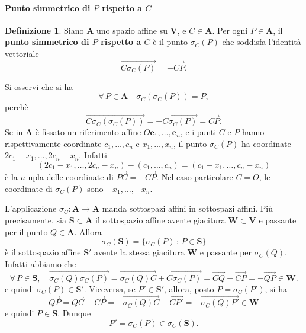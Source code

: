 \documentclass{article}
\theoremstyle{plain}
\theoremstyle{definition}
\newtheorem{defn}{Definizione}[section]
\theoremstyle{remark}
\begin{document}
\paragraph{Punto simmetrico di $P$ rispetto a $C$}
\begin{bxthm}
\begin{defn}
    Siano $\mathbf{A}$ uno spazio affine su $\mathbf{V}$, e $C\in\mathbf{A}$. 
    Per ogni $P\in \mathbf{A}$, il \textbf{punto simmetrico di $P$ rispetto a $C$} 
    è il punto $\sigma_C(P)$ che soddisfa l'identità vettoriale \[\overrightarrow{C\sigma_C(P)}=-\overrightarrow{CP}.\]
\end{defn}
\end{bxthm}

\vspace{10pt}

Si osservi che si ha \[\forall\,P\in\mathbf{A}\quad\sigma_C(\sigma_C(P)) = P,\]
perchè \[\overrightarrow{C\sigma_C(\sigma_C(P))}=-\overrightarrow{C\sigma_C(P)}=\overrightarrow{CP}.\]
Se in $\mathbf{A}$ è fissato un riferimento affine $O\mathbf{e}_1,\dots,\mathbf{e}_n$, e i punti $C$ e $P$ hanno rispettivamente coordinate $c_1,\dots,c_n$ e $x_1,\dots,x_n$, 
il punto $\sigma_C(P)$ ha coordinate $2c_1-x_1,\dots,2c_n-x_n$. Infatti 
\[(2c_1-x_1,\dots,2c_n-x_n)-(c_1,\dots,c_n)=(c_1-x_1,\dots,c_n-x_n)\] è la $n$-upla delle coordinate di $\overrightarrow{PC}=-\overrightarrow{CP}$. 
Nel caso particolare $C=O$, le coordinate di $\sigma_C(P)$ sono $-x_1,\dots,-x_n$.

\vspace{10pt}

L'applicazione $\sigma_C:\mathbf{A}\to\mathbf{A}$ manda sottospazi affini in sottospazi affini. 
Più precisamente, sia $\mathbf{S}\subset \mathbf{A}$ il sottospazio affine avente giacitura $\mathbf{W}\subset\mathbf{V}$ e passante per il punto $Q\in\mathbf{A}$. 
Allora \[\sigma_C(\mathbf{S})=\{\sigma_C(P)\,:\,P\in \mathbf{S}\}\] è il sottospazio affine $\mathbf{S}'$ avente la stessa giacitura $\mathbf{W}$ e passante per $\sigma_C(Q)$.
Infatti abbiamo che 
\[\forall\,P\in \mathbf{S},\quad \overrightarrow{\sigma_C(Q)\sigma_C(P)}=\overrightarrow{\sigma_C(Q)C}+\overrightarrow{C\sigma_C(P)}=\overrightarrow{CQ}-\overrightarrow{CP}=-\overrightarrow{QP}\in\mathbf{W}.\]
e quindi $\sigma_C(P)\in \mathbf{S}'$. Viceversa, se $P'\in \mathbf{S}'$, allora, posto $P=\sigma_C(P')$, si ha 
\[\overrightarrow{QP}=\overrightarrow{QC}+\overrightarrow{CP}=-\overrightarrow{\sigma_C(Q)C}-\overrightarrow{CP'}=-\overrightarrow{\sigma_C(Q)P'}\in\mathbf{W}\]
e quindi $P\in \mathbf{S}$. Dunque \[P'=\sigma_C(P)\in\sigma_C(\mathbf{S}).\]
    
\end{document}
